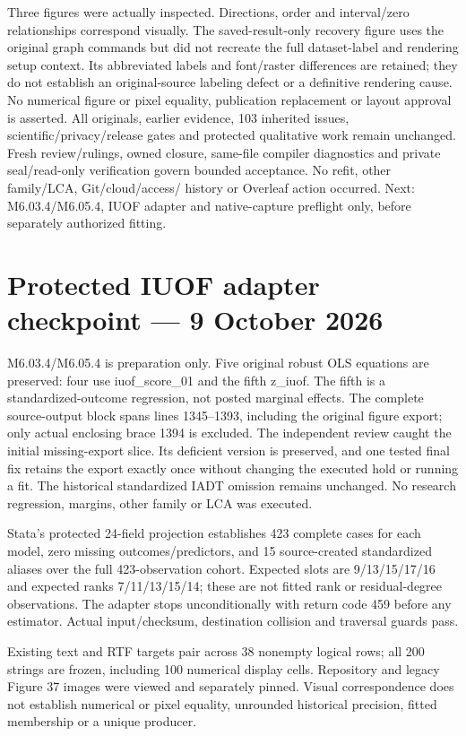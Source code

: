 \documentclass[11pt,a4paper]{article}
\begin{document}
Three figures were actually inspected. Directions, order and interval/zero
relationships correspond visually. The saved-result-only recovery figure
uses the original graph commands but did not recreate the full dataset-label
and rendering setup context. Its abbreviated labels and font/raster
differences are retained; they do not establish an original-source labeling
defect or a definitive rendering cause. No numerical figure or pixel equality, publication
replacement or layout approval is asserted. All originals, earlier evidence,
103 inherited issues, scientific/privacy/release gates and protected
qualitative work remain unchanged. Fresh review/rulings, owned closure,
same-file compiler diagnostics and private seal/read-only verification
govern bounded acceptance. No refit, other family/LCA, Git/cloud/access/
history or Overleaf action occurred. Next: M6.03.4/M6.05.4, IUOF adapter and
native-capture preflight only, before separately authorized fitting.
\section*{Protected IUOF adapter checkpoint --- 9 October 2026}
M6.03.4/M6.05.4 is preparation only. Five original robust OLS equations
are preserved: four use iuof\_score\_01 and the fifth z\_iuof.
The fifth is a standardized-outcome regression, not posted marginal effects.
The complete source-output block spans lines 1345--1393, including the
original figure export; only actual enclosing brace 1394 is excluded.
The independent review caught the initial missing-export slice. Its
deficient version is preserved, and one tested final fix retains the
export exactly once without changing the executed hold or running a fit.
The historical standardized IADT omission remains unchanged. No research
regression, margins, other family or LCA was executed.

Stata's protected 24-field projection establishes 423 complete cases for
each model, zero missing outcomes/predictors, and 15 source-created
standardized aliases over the full 423-observation cohort. Expected slots
are 9/13/15/17/16 and expected ranks 7/11/13/15/14; these are not fitted
rank or residual-degree observations. The adapter stops unconditionally
with return code 459 before any estimator. Actual input/checksum,
destination collision and traversal guards pass.

Existing text and RTF targets pair across 38 nonempty logical rows;
all 200 strings are frozen, including 100 numerical display cells.
Repository and legacy Figure 37 images were viewed and separately pinned.
Visual correspondence does not establish numerical or pixel equality,
unrounded historical precision, fitted membership or a unique producer.
\end{document}
